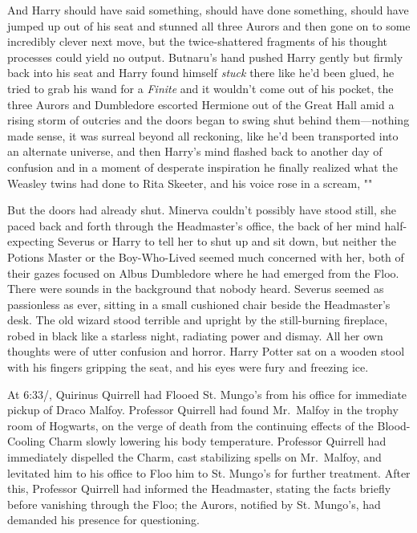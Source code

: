 And Harry should have said something, should have done something, should have
jumped up out of his seat and stunned all three Aurors and then gone on to some
incredibly clever next move, but the twice-shattered fragments of his thought
processes could yield no output. Butnaru's hand pushed Harry gently but firmly
back into his seat and Harry found himself \emph{stuck} there like he'd been
glued, he tried to grab his wand for a \emph{Finite} and it wouldn't come out
of his pocket, the three Aurors and Dumbledore escorted Hermione out of the
Great Hall amid a rising storm of outcries and the doors began to swing shut
behind them---nothing made sense, it was surreal beyond all reckoning, like
he'd been transported into an alternate universe, and then Harry's mind flashed
back to another day of confusion and in a moment of desperate inspiration he
finally realized what the Weasley twins had done to Rita Skeeter, and his voice
rose in a scream, "\emph{}"

But the doors had already shut.
\sbreak
Minerva couldn't possibly have stood still, she paced back and forth through
the Headmaster's office, the back of her mind half-expecting Severus or Harry
to tell her to shut up and sit down, but neither the Potions Master or the
Boy-Who-Lived seemed much concerned with her, both of their gazes focused on
Albus Dumbledore where he had emerged from the Floo. There were sounds in the
background that nobody heard. Severus seemed as passionless as ever, sitting in
a small cushioned chair beside the Headmaster's desk. The old wizard stood
terrible and upright by the still-burning fireplace, robed in black like a
starless night, radiating power and dismay. All her own thoughts were of utter
confusion and horror. Harry Potter sat on a wooden stool with his fingers
gripping the seat, and his eyes were fury and freezing ice.

At 6:33\AM/, Quirinus Quirrell had Flooed St. Mungo's from his office for
immediate pickup of Draco Malfoy. Professor Quirrell had found Mr.~Malfoy in
the trophy room of Hogwarts, on the verge of death from the continuing effects
of the Blood-Cooling Charm slowly lowering his body temperature. Professor
Quirrell had immediately dispelled the Charm, cast stabilizing spells on
Mr.~Malfoy, and levitated him to his office to Floo him to St. Mungo's for
further treatment. After this, Professor Quirrell had informed the Headmaster,
stating the facts briefly before vanishing through the Floo; the Aurors,
notified by St. Mungo's, had demanded his presence for questioning.

